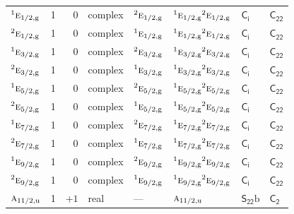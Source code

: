 \documentclass[10pt,a4paper]{article}
\numberwithin{equation}{section}
\newcommand{\grp}[1]{\mathsf{#1}}
\newcommand{\irr}[1]{\text{\normalfont\scshape #1}}
\newcommand{\conjpair}[1]{{}^{#1}}
\newcommand{\ptag}[1]{\mathrm{#1}}
\newcommand{\secondclass}{\mathrm{b}}
\begin{document}
{\begin{longtable}{@{}lrrlllll@{}}
$\conjpair{1}\irr{e}_{1/2,\ptag{g}}$ & 1 & $0$ & complex & $\conjpair{2}\irr{e}_{1/2,\ptag{g}}$ & $\conjpair{1}\irr{e}_{1/2,\ptag{g}}\conjpair{2}\irr{e}_{1/2,\ptag{g}}$ & \href{S2.pdf}{$\grp{C_{i}}$} & $\grp{C_{22}}$\\
$\conjpair{2}\irr{e}_{1/2,\ptag{g}}$ & 1 & $0$ & complex & $\conjpair{1}\irr{e}_{1/2,\ptag{g}}$ & $\conjpair{1}\irr{e}_{1/2,\ptag{g}}\conjpair{2}\irr{e}_{1/2,\ptag{g}}$ & \href{S2.pdf}{$\grp{C_{i}}$} & $\grp{C_{22}}$\\
$\conjpair{1}\irr{e}_{3/2,\ptag{g}}$ & 1 & $0$ & complex & $\conjpair{2}\irr{e}_{3/2,\ptag{g}}$ & $\conjpair{1}\irr{e}_{3/2,\ptag{g}}\conjpair{2}\irr{e}_{3/2,\ptag{g}}$ & \href{S2.pdf}{$\grp{C_{i}}$} & $\grp{C_{22}}$\\
$\conjpair{2}\irr{e}_{3/2,\ptag{g}}$ & 1 & $0$ & complex & $\conjpair{1}\irr{e}_{3/2,\ptag{g}}$ & $\conjpair{1}\irr{e}_{3/2,\ptag{g}}\conjpair{2}\irr{e}_{3/2,\ptag{g}}$ & \href{S2.pdf}{$\grp{C_{i}}$} & $\grp{C_{22}}$\\
$\conjpair{1}\irr{e}_{5/2,\ptag{g}}$ & 1 & $0$ & complex & $\conjpair{2}\irr{e}_{5/2,\ptag{g}}$ & $\conjpair{1}\irr{e}_{5/2,\ptag{g}}\conjpair{2}\irr{e}_{5/2,\ptag{g}}$ & \href{S2.pdf}{$\grp{C_{i}}$} & $\grp{C_{22}}$\\
$\conjpair{2}\irr{e}_{5/2,\ptag{g}}$ & 1 & $0$ & complex & $\conjpair{1}\irr{e}_{5/2,\ptag{g}}$ & $\conjpair{1}\irr{e}_{5/2,\ptag{g}}\conjpair{2}\irr{e}_{5/2,\ptag{g}}$ & \href{S2.pdf}{$\grp{C_{i}}$} & $\grp{C_{22}}$\\
$\conjpair{1}\irr{e}_{7/2,\ptag{g}}$ & 1 & $0$ & complex & $\conjpair{2}\irr{e}_{7/2,\ptag{g}}$ & $\conjpair{1}\irr{e}_{7/2,\ptag{g}}\conjpair{2}\irr{e}_{7/2,\ptag{g}}$ & \href{S2.pdf}{$\grp{C_{i}}$} & $\grp{C_{22}}$\\
$\conjpair{2}\irr{e}_{7/2,\ptag{g}}$ & 1 & $0$ & complex & $\conjpair{1}\irr{e}_{7/2,\ptag{g}}$ & $\conjpair{1}\irr{e}_{7/2,\ptag{g}}\conjpair{2}\irr{e}_{7/2,\ptag{g}}$ & \href{S2.pdf}{$\grp{C_{i}}$} & $\grp{C_{22}}$\\
$\conjpair{1}\irr{e}_{9/2,\ptag{g}}$ & 1 & $0$ & complex & $\conjpair{2}\irr{e}_{9/2,\ptag{g}}$ & $\conjpair{1}\irr{e}_{9/2,\ptag{g}}\conjpair{2}\irr{e}_{9/2,\ptag{g}}$ & \href{S2.pdf}{$\grp{C_{i}}$} & $\grp{C_{22}}$\\
$\conjpair{2}\irr{e}_{9/2,\ptag{g}}$ & 1 & $0$ & complex & $\conjpair{1}\irr{e}_{9/2,\ptag{g}}$ & $\conjpair{1}\irr{e}_{9/2,\ptag{g}}\conjpair{2}\irr{e}_{9/2,\ptag{g}}$ & \href{S2.pdf}{$\grp{C_{i}}$} & $\grp{C_{22}}$\\
$\irr{a}_{11/2,\ptag{u}}$ & 1 & $+1$ & real & --- & $\irr{a}_{11/2,\ptag{u}}$ & \href{S22b.pdf}{$\grp{S_{22}}\secondclass$} & \href{../../../rotation/data/pdf/C2.pdf}{$\grp{C_{2}}$}\\

\end{longtable}}
\end{document}
